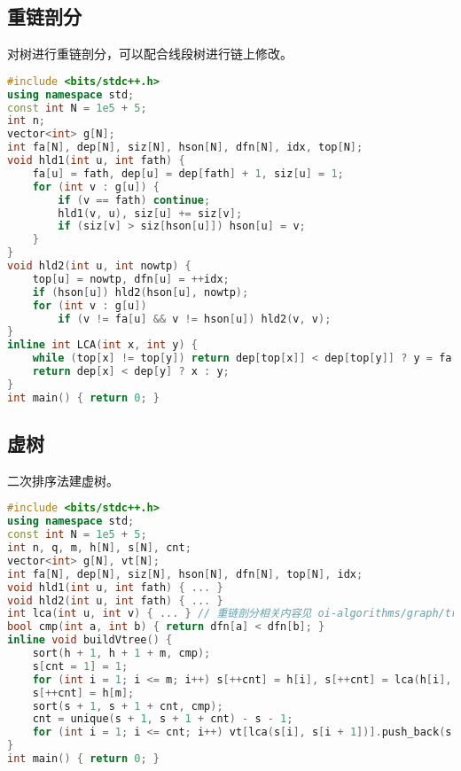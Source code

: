 \documentclass[9pt, a4paper, oneside]{book}
\begin{document}
\subsection{重链剖分}
对树进行重链剖分，可以配合线段树进行链上修改。
\begin{lstlisting}[language={C++}]
#include <bits/stdc++.h>
using namespace std;
const int N = 1e5 + 5;
int n;
vector<int> g[N];
int fa[N], dep[N], siz[N], hson[N], dfn[N], idx, top[N];
void hld1(int u, int fath) {
    fa[u] = fath, dep[u] = dep[fath] + 1, siz[u] = 1;
    for (int v : g[u]) {
        if (v == fath) continue;
        hld1(v, u), siz[u] += siz[v];
        if (siz[v] > siz[hson[u]]) hson[u] = v;
    }
}
void hld2(int u, int nowtp) {
    top[u] = nowtp, dfn[u] = ++idx;
    if (hson[u]) hld2(hson[u], nowtp);
    for (int v : g[u])
        if (v != fa[u] && v != hson[u]) hld2(v, v);
}
inline int LCA(int x, int y) {
    while (top[x] != top[y]) return dep[top[x]] < dep[top[y]] ? y = fa[top[y]] : x = fa[top[x]];
    return dep[x] < dep[y] ? x : y;
}
int main() { return 0; }\end{lstlisting}
\subsection{虚树}
二次排序法建虚树。
\begin{lstlisting}[language={C++}]
#include <bits/stdc++.h>
using namespace std;
const int N = 1e5 + 5;
int n, q, m, h[N], s[N], cnt;
vector<int> g[N], vt[N];
int fa[N], dep[N], siz[N], hson[N], dfn[N], top[N], idx;
void hld1(int u, int fath) { ... }
void hld2(int u, int fath) { ... }
int lca(int u, int v) { ... } // 重链剖分相关内容见 oi-algorithms/graph/tree/hld.cpp
bool cmp(int a, int b) { return dfn[a] < dfn[b]; }
inline void buildVtree() {
    sort(h + 1, h + 1 + m, cmp);
    s[cnt = 1] = 1;
    for (int i = 1; i <= m; i++) s[++cnt] = h[i], s[++cnt] = lca(h[i], h[i + 1]);
    s[++cnt] = h[m];
    sort(s + 1, s + 1 + cnt, cmp);
    cnt = unique(s + 1, s + 1 + cnt) - s - 1;
    for (int i = 1; i <= cnt; i++) vt[lca(s[i], s[i + 1])].push_back(s[i + 1]);
}
int main() { return 0; }\end{lstlisting}
\end{document}

